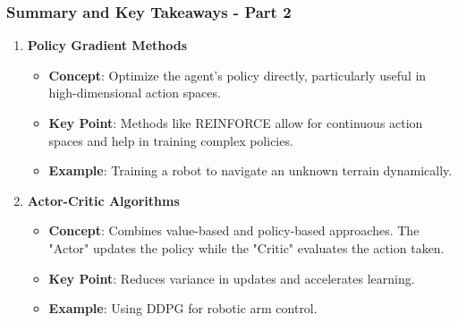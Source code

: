 \documentclass[aspectratio=169]{beamer}
\begin{document}
\begin{frame}[fragile]
    \frametitle{Summary and Key Takeaways - Part 2}
    \begin{enumerate}
        \item \textbf{Policy Gradient Methods}
        \begin{itemize}
            \item \textbf{Concept}: Optimize the agent's policy directly, particularly useful in high-dimensional action spaces.
            \item \textbf{Key Point}: Methods like REINFORCE allow for continuous action spaces and help in training complex policies.
            \item \textbf{Example}: Training a robot to navigate an unknown terrain dynamically.
        \end{itemize}

        \item \textbf{Actor-Critic Algorithms}
        \begin{itemize}
            \item \textbf{Concept}: Combines value-based and policy-based approaches. The "Actor" updates the policy while the "Critic" evaluates the action taken.
            \item \textbf{Key Point}: Reduces variance in updates and accelerates learning.
            \item \textbf{Example}: Using DDPG for robotic arm control.
        \end{itemize}
    \end{enumerate}
\end{frame}
\end{document}
